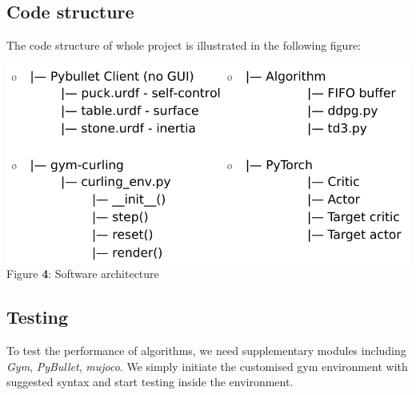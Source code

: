 \documentclass[oneside,11pt,a4paper]{article}
\begin{document}
\subsection{Code structure}
The code structure of whole project is illustrated in the following figure:
\begin{center}
    \includegraphics[scale=.4]{Arch.png}\\
    Figure \textbf{4}: Software architecture
\end{center}

\vspace{1cm}
\subsection{Testing}
To test the performance of algorithms, we need supplementary modules including \textit{Gym}, \textit{PyBullet}, \textit{mujoco}. We simply initiate the customised gym environment with suggested syntax and start testing inside the environment.



\clearpage
\lhead{}\rhead{}
{}
\nocite{*}


\clearpage
\end{document}
